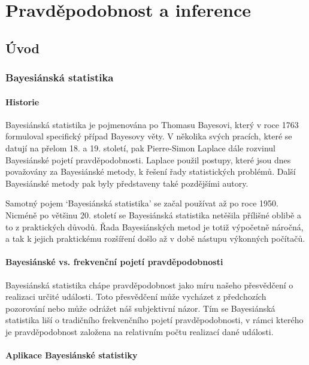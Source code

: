 \chapter{Pravděpodobnost a inference}

\section{Úvod}

\subsection{Bayesiánská statistika}

\subsubsection{Historie}

Bayesiánská statistika je pojmenována po Thomasu Bayesovi, který v roce 1763 formuloval specifický případ Bayesovy věty. V několika svých pracích, které se datují na přelom 18. a 19. století, pak Pierre-Simon Laplace dále rozvinul Bayesiánské pojetí pravděpodobnosti. Laplace použil postupy, které jsou dnes považovány za Bayesiánské metody, k řešení řady statistických problémů. Další Bayesiánské metody pak byly představeny také pozdějšími autory.

Samotný pojem `Bayesiánská statistika' se začal používat až po roce 1950. Nicméně po většinu 20. století se Bayesiánská statistika netěšila přílišné oblibě a to z praktických důvodů. Řada Bayesiánských metod je totiž výpočetně náročná, a tak k jejich praktickému rozšíření došlo až v době nástupu výkonných počítačů.

\subsubsection{Bayesiánské vs. frekvenční pojetí pravděpodobnosti}

Bayesiánská statistika chápe pravděpodobnost jako míru našeho přesvědčení o realizaci určité události. Toto přesvědčení může vycházet z předchozích pozorování nebo může odrážet náš subjektivní názor. Tím se Bayesiánská statistika liší o tradičního frekvenčního pojetí pravděpodobnosti, v rámci kterého je pravděpodobnost založena na relativním počtu realizací dané události.

\subsubsection{Aplikace Bayesiánské statistiky}

